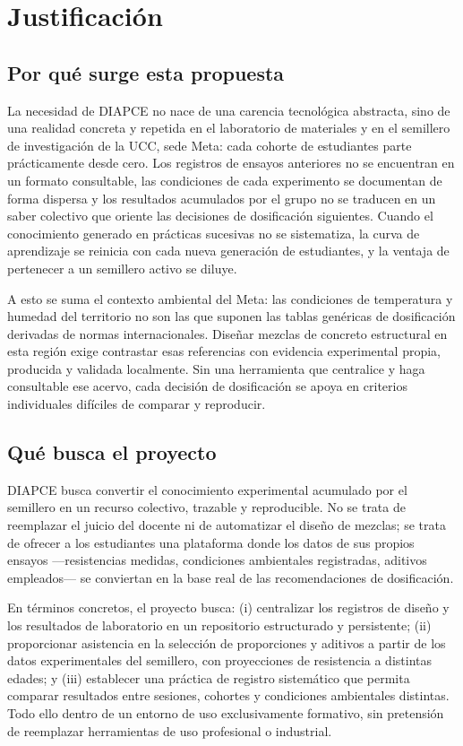 \section{Justificación}

\subsection*{Por qué surge esta propuesta}

La necesidad de DIAPCE no nace de una carencia tecnológica abstracta, sino de una realidad concreta y repetida en el laboratorio de materiales y en el semillero de investigación de la UCC, sede Meta: cada cohorte de estudiantes parte prácticamente desde cero. Los registros de ensayos anteriores no se encuentran en un formato consultable, las condiciones de cada experimento se documentan de forma dispersa y los resultados acumulados por el grupo no se traducen en un saber colectivo que oriente las decisiones de dosificación siguientes. Cuando el conocimiento generado en prácticas sucesivas no se sistematiza, la curva de aprendizaje se reinicia con cada nueva generación de estudiantes, y la ventaja de pertenecer a un semillero activo se diluye.

A esto se suma el contexto ambiental del Meta: las condiciones de temperatura y humedad del territorio no son las que suponen las tablas genéricas de dosificación derivadas de normas internacionales. Diseñar mezclas de concreto estructural en esta región exige contrastar esas referencias con evidencia experimental propia, producida y validada localmente. Sin una herramienta que centralice y haga consultable ese acervo, cada decisión de dosificación se apoya en criterios individuales difíciles de comparar y reproducir.

\subsection*{Qué busca el proyecto}

DIAPCE busca convertir el conocimiento experimental acumulado por el semillero en un recurso colectivo, trazable y reproducible. No se trata de reemplazar el juicio del docente ni de automatizar el diseño de mezclas; se trata de ofrecer a los estudiantes una plataforma donde los datos de sus propios ensayos —resistencias medidas, condiciones ambientales registradas, aditivos empleados— se conviertan en la base real de las recomendaciones de dosificación.

En términos concretos, el proyecto busca: (i) centralizar los registros de diseño y los resultados de laboratorio en un repositorio estructurado y persistente; (ii) proporcionar asistencia en la selección de proporciones y aditivos a partir de los datos experimentales del semillero, con proyecciones de resistencia a distintas edades; y (iii) establecer una práctica de registro sistemático que permita comparar resultados entre sesiones, cohortes y condiciones ambientales distintas. Todo ello dentro de un entorno de uso exclusivamente formativo, sin pretensión de reemplazar herramientas de uso profesional o industrial.

